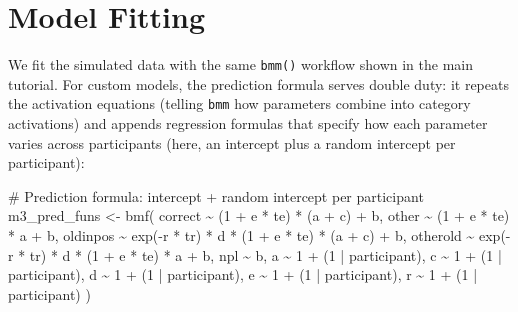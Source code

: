 \documentclass[
  man,
  floatsintext,
  longtable,
  nolmodern,
  notxfonts,
  notimes,
  colorlinks=true,linkcolor=blue,citecolor=blue,urlcolor=blue]{apa7}
\newenvironment{Shaded}{\begin{snugshade}}{\end{snugshade}}
\newcommand{\CommentTok}[1]{\textcolor[rgb]{0.37,0.37,0.37}{#1}}
\newcommand{\DecValTok}[1]{\textcolor[rgb]{0.68,0.00,0.00}{#1}}
\newcommand{\FunctionTok}[1]{\textcolor[rgb]{0.28,0.35,0.67}{#1}}
\newcommand{\NormalTok}[1]{\textcolor[rgb]{0.00,0.23,0.31}{#1}}
\newcommand{\OtherTok}[1]{\textcolor[rgb]{0.00,0.23,0.31}{#1}}
\newcommand{\SpecialCharTok}[1]{\textcolor[rgb]{0.37,0.37,0.37}{#1}}
\begin{document}
\section{Model Fitting}\label{model-fitting}

We fit the simulated data with the same \texttt{bmm()} workflow shown in
the main tutorial. For custom models, the prediction formula serves
double duty: it repeats the activation equations (telling \texttt{bmm}
how parameters combine into category activations) and appends regression
formulas that specify how each parameter varies across participants
(here, an intercept plus a random intercept per participant):

\begin{Shaded}
\begin{Highlighting}[]
\CommentTok{\# Prediction formula: intercept + random intercept per participant}
\NormalTok{m3\_pred\_funs }\OtherTok{\textless{}{-}} \FunctionTok{bmf}\NormalTok{(}
\NormalTok{  correct  }\SpecialCharTok{\textasciitilde{}}\NormalTok{ (}\DecValTok{1} \SpecialCharTok{+}\NormalTok{ e }\SpecialCharTok{*}\NormalTok{ te) }\SpecialCharTok{*}\NormalTok{ (a }\SpecialCharTok{+}\NormalTok{ c) }\SpecialCharTok{+}\NormalTok{ b,}
\NormalTok{  other    }\SpecialCharTok{\textasciitilde{}}\NormalTok{ (}\DecValTok{1} \SpecialCharTok{+}\NormalTok{ e }\SpecialCharTok{*}\NormalTok{ te) }\SpecialCharTok{*}\NormalTok{ a }\SpecialCharTok{+}\NormalTok{ b,}
\NormalTok{  oldinpos }\SpecialCharTok{\textasciitilde{}} \FunctionTok{exp}\NormalTok{(}\SpecialCharTok{{-}}\NormalTok{r }\SpecialCharTok{*}\NormalTok{ tr) }\SpecialCharTok{*}\NormalTok{ d }\SpecialCharTok{*}\NormalTok{ (}\DecValTok{1} \SpecialCharTok{+}\NormalTok{ e }\SpecialCharTok{*}\NormalTok{ te) }\SpecialCharTok{*}\NormalTok{ (a }\SpecialCharTok{+}\NormalTok{ c) }\SpecialCharTok{+}\NormalTok{ b,}
\NormalTok{  otherold }\SpecialCharTok{\textasciitilde{}} \FunctionTok{exp}\NormalTok{(}\SpecialCharTok{{-}}\NormalTok{r }\SpecialCharTok{*}\NormalTok{ tr) }\SpecialCharTok{*}\NormalTok{ d }\SpecialCharTok{*}\NormalTok{ (}\DecValTok{1} \SpecialCharTok{+}\NormalTok{ e }\SpecialCharTok{*}\NormalTok{ te) }\SpecialCharTok{*}\NormalTok{ a }\SpecialCharTok{+}\NormalTok{ b,}
\NormalTok{  npl      }\SpecialCharTok{\textasciitilde{}}\NormalTok{ b,}
\NormalTok{  a }\SpecialCharTok{\textasciitilde{}} \DecValTok{1} \SpecialCharTok{+}\NormalTok{ (}\DecValTok{1} \SpecialCharTok{|}\NormalTok{ participant),}
\NormalTok{  c }\SpecialCharTok{\textasciitilde{}} \DecValTok{1} \SpecialCharTok{+}\NormalTok{ (}\DecValTok{1} \SpecialCharTok{|}\NormalTok{ participant),}
\NormalTok{  d }\SpecialCharTok{\textasciitilde{}} \DecValTok{1} \SpecialCharTok{+}\NormalTok{ (}\DecValTok{1} \SpecialCharTok{|}\NormalTok{ participant),}
\NormalTok{  e }\SpecialCharTok{\textasciitilde{}} \DecValTok{1} \SpecialCharTok{+}\NormalTok{ (}\DecValTok{1} \SpecialCharTok{|}\NormalTok{ participant),}
\NormalTok{  r }\SpecialCharTok{\textasciitilde{}} \DecValTok{1} \SpecialCharTok{+}\NormalTok{ (}\DecValTok{1} \SpecialCharTok{|}\NormalTok{ participant)}
\NormalTok{)}


\end{Highlighting}
\end{Shaded}
\end{document}
